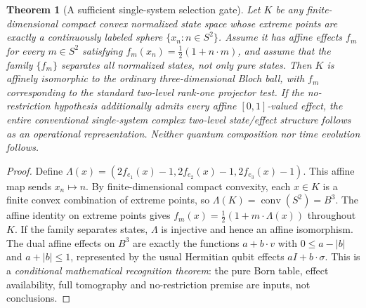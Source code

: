 \documentclass[10.5pt,letterpaper]{article}
\newtheorem{theorem}{Theorem}
\newcommand{\conv}{\operatorname{conv}}
\begin{document}
\begin{theorem}[A sufficient single-system selection gate]\label{thm:selection}
Let $K$ be any finite-dimensional compact convex normalized state space whose extreme points are exactly a continuously labeled sphere $\{x_n:n\in S^2\}$. Assume it has affine effects $f_m$ for every $m\in S^2$ satisfying $f_m(x_n)=\tfrac12(1+n\cdot m)$, and assume that the family $\{f_m\}$ separates \emph{all} normalized states, not only pure states. Then $K$ is affinely isomorphic to the ordinary three-dimensional Bloch ball, with $f_m$ corresponding to the standard two-level rank-one projector test. If the \emph{no-restriction hypothesis} additionally admits every affine $[0,1]$-valued effect, the entire conventional single-system complex two-level state/effect structure follows as an operational representation. Neither quantum composition nor time evolution follows.
\end{theorem}
\begin{proof}
Define $\Lambda(x)=(2f_{e_1}(x)-1,2f_{e_2}(x)-1,2f_{e_3}(x)-1)$. This affine map sends $x_n\mapsto n$. By finite-dimensional compact convexity, each $x\in K$ is a finite convex combination of extreme points, so $\Lambda(K)=\conv(S^2)=B^3$. The affine identity on extreme points gives $f_m(x)=\tfrac12(1+m\cdot\Lambda(x))$ throughout $K$. If the family separates states, $\Lambda$ is injective and hence an affine isomorphism. The dual affine effects on $B^3$ are exactly the functions $a+b\cdot v$ with $0\le a-|b|$ and $a+|b|\le1$, represented by the usual Hermitian qubit effects $aI+b\cdot\sigma$. This is a \emph{conditional mathematical recognition theorem}: the pure Born table, effect availability, full tomography and no-restriction premise are inputs, not conclusions.
\end{proof}
\end{document}

